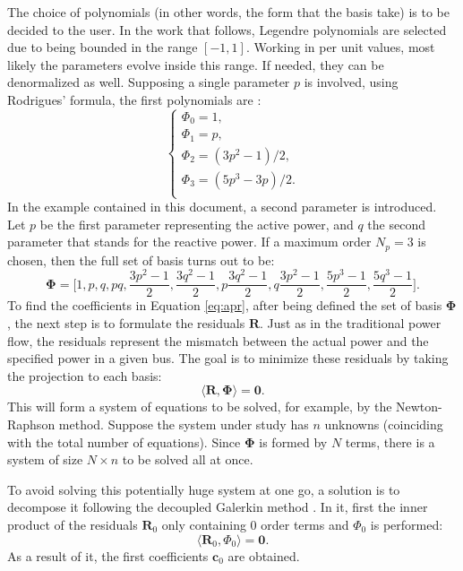The choice of polynomials (in other words, the form that the basis take) is to be decided to the user. In the work that follows, Legendre polynomials are selected due to being bounded in the range $[-1,1]$. Working in per unit values, most likely the parameters evolve inside this range. If needed, they can be denormalized as well. Supposing a single parameter $p$ is involved, using Rodrigues' formula, the first polynomials are \cite{mccarthy1993generalized}:
\begin{equation}
   \begin{cases}
      \Phi_0 = 1,\\
      \Phi_1 = p,\\
      \Phi_2 = (3p^2-1)/2,\\
      \Phi_3 = (5p^3-3p)/2.\\
   \end{cases}
\end{equation}
In the example contained in this document, a second parameter is introduced. Let $p$ be the first parameter representing the active power, and $q$ the second parameter that stands for the reactive power. If a maximum order $N_p=3$ is chosen, then the full set of basis turns out to be:
\begin{equation}
   \bm{\Phi} = \biggl[1, p, q, pq, \frac{3p^2-1}{2}, \frac{3q^2-1}{2}, p\frac{3q^2-1}{2}, q\frac{3p^2-1}{2}, \frac{5p^3-1}{2}, \frac{5q^3-1}{2}\biggr].
   \label{eq:exp}
\end{equation}
To find the coefficients in Equation \ref{eq:apr}, after being defined the set of basis $\bm{\Phi}$, the next step is to formulate the residuals $\bm{R}$. Just as in the traditional power flow, the residuals represent the mismatch between the actual power and the specified power in a given bus. The goal is to minimize these residuals by taking the projection to each basis:
\begin{equation}
   \langle \bm{R}, \bm{\Phi} \rangle = \bm{0}.
\end{equation}
This will form a system of equations to be solved, for example, by the Newton-Raphson method. Suppose the system under study has $n$ unknowns (coinciding with the total number of equations). Since $\bm{\Phi}$ is formed by $N$ terms, there is a system of size $N \times n$ to be solved all at once. 

To avoid solving this potentially huge system at one go, a solution is to decompose it following the decoupled Galerkin method \cite{zhou2016novel}. In it, first the inner product of the residuals $\bm{R}_{0}$ only containing 0 order terms and $\Phi_0$ is performed:
\begin{equation}
   \langle \bm{R}_0, \Phi_0 \rangle = \bm{0}.
\end{equation}
As a result of it, the first coefficients $\bm{c}_0$ are obtained. 

